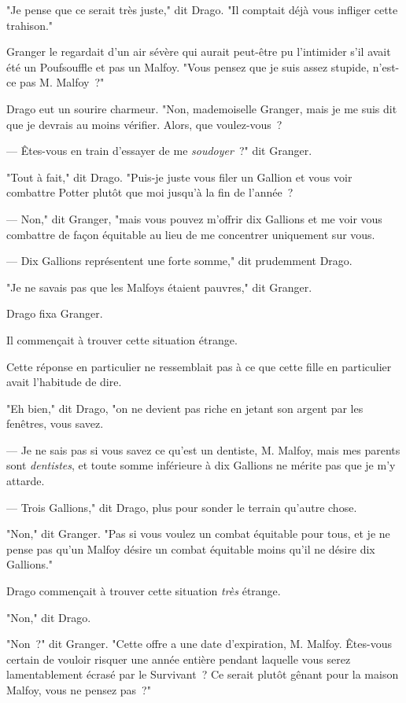 "Je pense que ce serait très juste," dit Drago. "Il comptait déjà vous infliger cette trahison."

Granger le regardait d'un air sévère qui aurait peut-être pu l'intimider s'il avait été un Poufsouffle et pas un Malfoy. "Vous pensez que je suis assez stupide, n'est-ce pas M. Malfoy~?"

Drago eut un sourire charmeur. "Non, mademoiselle Granger, mais je me suis dit que je devrais au moins vérifier. Alors, que voulez-vous~?

--- Êtes-vous en train d'essayer de me \emph{soudoyer}~?" dit Granger.

"Tout à fait," dit Drago. "Puis-je juste vous filer un Gallion et vous voir combattre Potter plutôt que moi jusqu'à la fin de l'année~?

--- Non," dit Granger, "mais vous pouvez m'offrir dix Gallions et me voir vous combattre de façon équitable au lieu de me concentrer uniquement sur vous.

--- Dix Gallions représentent une forte somme," dit prudemment Drago.

"Je ne savais pas que les Malfoys étaient pauvres," dit Granger.

Drago fixa Granger.

Il commençait à trouver cette situation étrange.

Cette réponse en particulier ne ressemblait pas à ce que cette fille en particulier avait l'habitude de dire.

"Eh bien," dit Drago, "on ne devient pas riche en jetant son argent par les fenêtres, vous savez.

--- Je ne sais pas si vous savez ce qu'est un dentiste, M. Malfoy, mais mes parents sont \emph{dentistes}, et toute somme inférieure à dix Gallions ne mérite pas que je m'y attarde.

--- Trois Gallions," dit Drago, plus pour sonder le terrain qu'autre chose.

"Non," dit Granger. "Pas si vous voulez un combat équitable pour tous, et je ne pense pas qu'un Malfoy désire un combat équitable moins qu'il ne désire dix Gallions."

Drago commençait à trouver cette situation \emph{très} étrange.

"Non," dit Drago.

"Non~?" dit Granger. "Cette offre a une date d'expiration, M. Malfoy. Êtes-vous certain de vouloir risquer une année entière pendant laquelle vous serez lamentablement écrasé par le Survivant~? Ce serait plutôt gênant pour la maison Malfoy, vous ne pensez pas~?"

